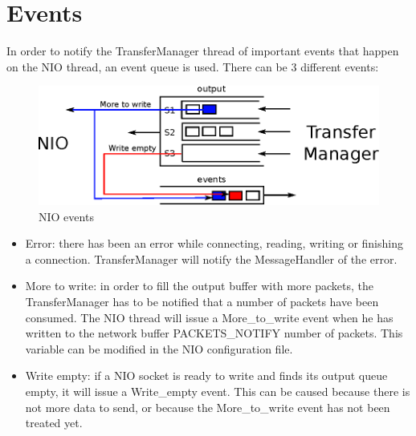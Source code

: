 \documentclass[11pt]{article}
\begin{document}
\section{Events}
	In order to notify the TransferManager thread of important events that happen on the NIO thread, an event queue is used. There can be 3 different events:
	\begin{figure}[H]
	\centering
	\includegraphics[width=120mm]{img/drawing7.eps}
	\caption[NIO events]{NIO events}
	\label{drawing7}
	\end{figure}
	\begin{itemize}
		\item Error: there has been an error while connecting, reading, writing or finishing a connection. TransferManager will notify the MessageHandler of the error.
		\item More to write: in order to fill the output buffer with more packets, the TransferManager has to be notified that a number of packets have been consumed. The NIO thread will issue a More\_to\_write event when he has written to the network buffer PACKETS\_NOTIFY number of packets. This variable can be modified in the NIO configuration file.
		\item Write empty: if a NIO socket is ready to write and finds its output queue empty, it will issue a Write\_empty event. This can be caused because there is not more data to send, or because the More\_to\_write event has not been treated yet.
	\end{itemize}
\end{document}
